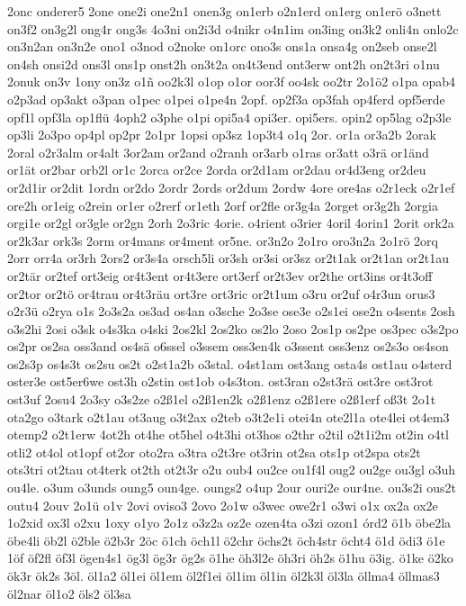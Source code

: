 {2onc
onderer5
2one
one2i
one2n1
onen3g
on1erb
o2n1erd
on1erg
on1erö
o3nett
on3f2
on3g2l
ong4r
ong3s
4o3ni
on2i3d
o4nikr
o4n1im
on3ing
on3k2
onli4n
onlo2c
on3n2an
on3n2e
ono1
o3nod
o2noke
on1orc
ono3s
ons1a
onsa4g
on2seb
onse2l
on4sh
onsi2d
ons3l
ons1p
onst2h
on3t2a
on4t3end
ont3erw
ont2h
on2t3ri
o1nu
2onuk
on3v
1ony
on3z
o1ñ
oo2k3l
o1op
o1or
oor3f
oo4sk
oo2tr
2o1ö2
o1pa
opab4
o2p3ad
op3akt
o3pan
o1pec
o1pei
o1pe4n
2opf.
op2f3a
op3fah
op4ferd
opf5erde
opf1l
opf3la
op1flü
4oph2
o3phe
o1pi
opi5a4
opi3er.
opi5ers.
opin2
op5lag
o2p3le
op3li
2o3po
op4pl
op2pr
2o1pr
1opsi
op3sz
1op3t4
o1q
2or.
or1a
or3a2b
2orak
2oral
o2r3alm
or4alt
3or2am
or2and
o2ranh
or3arb
o1ras
or3att
o3rä
or1änd
or1ät
or2bar
orb2l
or1c
2orca
or2ce
2orda
or2d1am
or2dau
or4d3eng
or2deu
or2d1ir
or2dit
1ordn
or2do
2ordr
2ords
or2dum
2ordw
4ore
ore4as
o2r1eck
o2r1ef
ore2h
or1eig
o2rein
or1er
o2rerf
or1eth
2orf
or2fle
or3g4a
2orget
or3g2h
2orgia
orgi1e
or2gl
or3gle
or2gn
2orh
2o3ric
4orie.
o4rient
o3rier
4oril
4orin1
2orit
ork2a
or2k3ar
ork3s
2orm
or4mans
or4ment
or5ne.
or3n2o
2o1ro
oro3n2a
2o1rö
2orq
2orr
orr4a
or3rh
2ors2
or3s4a
orsch5li
or3sh
or3si
or3sz
or2t1ak
or2t1an
or2t1au
or2tär
or2tef
ort3eig
or4t3ent
or4t3ere
ort3erf
or2t3ev
or2the
ort3ins
or4t3off
or2tor
or2tö
or4trau
or4t3räu
ort3re
ort3ric
or2t1um
o3ru
or2uf
o4r3un
orus3
o2r3ü
o2rya
o1s
2o3s2a
os3ad
os4an
o3sche
2o3se
ose3e
o2s1ei
ose2n
o4sents
2osh
o3s2hi
2osi
o3sk
o4s3ka
o4ski
2os2kl
2os2ko
os2lo
2oso
2os1p
os2pe
os3pec
o3s2po
os2pr
os2sa
oss3and
os4sä
o6ssel
o3ssem
oss3en4k
o3ssent
oss3enz
os2s3o
os4son
os2s3p
os4s3t
os2su
os2t
o2st1a2b
o3stal.
o4st1am
ost3ang
osta4s
ost1au
o4sterd
oster3e
ost5er6we
ost3h
o2stin
ost1ob
o4s3ton.
ost3ran
o2st3rä
ost3re
ost3rot
ost3uf
2osu4
2o3sy
o3s2ze
o2ß1el
o2ß1en2k
o2ß1enz
o2ß1ere
o2ß1erf
oß3t
2o1t
ota2go
o3tark
o2t1au
ot3aug
o3t2ax
o2teb
o3t2e1i
otei4n
ote2l1a
ote4lei
ot4em3
otemp2
o2t1erw
4ot2h
ot4he
ot5hel
o4t3hi
ot3hos
o2thr
o2til
o2t1i2m
ot2in
o4tl
otli2
ot4ol
ot1opf
ot2or
oto2ra
o3tra
o2t3re
ot3rin
ot2sa
ots1p
ot2spa
ots2t
ots3tri
ot2tau
ot4terk
ot2th
ot2t3r
o2u
oub4
ou2ce
ou1f4l
oug2
ou2ge
ou3gl
o3uh
ou4le.
o3um
o3unds
oung5
oun4ge.
oungs2
o4up
2our
ouri2e
our4ne.
ou3s2i
ous2t
outu4
2ouv
2o1ü
o1v
2ovi
oviso3
2ovo
2o1w
o3wec
owe2r1
o3wi
o1x
ox2a
ox2e
1o2xid
ox3l
o2xu
1oxy
o1yo
2o1z
o3z2a
oz2e
ozen4ta
o3zi
ozon1
órd2
ö1b
öbe2la
öbe4li
öb2l
ö2ble
ö2b3r
2öc
ö1ch
öch1l
ö2chr
öchs2t
öch4str
öcht4
ö1d
ödi3
ö1e
1öf
öf2fl
öf3l
ögen4s1
ög3l
ög3r
ög2s
ö1he
öh3l2e
öh3ri
öh2s
ö1hu
ö3ig.
ö1ke
ö2ko
ök3r
ök2s
3öl.
öl1a2
öl1ei
öl1em
öl2f1ei
öl1im
öl1in
öl2k3l
öl3la
öllma4
öllmas3
öl2nar
öl1o2
öls2
öl3sa
}
